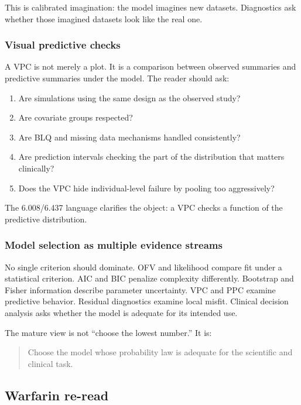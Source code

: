 This is calibrated imagination: the model imagines new datasets.  Diagnostics ask whether those imagined datasets look like the real one.

\subsubsection*{Visual predictive checks}

A VPC is not merely a plot.  It is a comparison between observed summaries and predictive summaries under the model.  The reader should ask:
\begin{enumerate}[leftmargin=2em]
  \item Are simulations using the same design as the observed study?
  \item Are covariate groups respected?
  \item Are BLQ and missing data mechanisms handled consistently?
  \item Are prediction intervals checking the part of the distribution that matters clinically?
  \item Does the VPC hide individual-level failure by pooling too aggressively?
\end{enumerate}
The 6.008/6.437 language clarifies the object: a VPC checks a function of the predictive distribution.

\subsubsection*{Model selection as multiple evidence streams}

No single criterion should dominate.  OFV and likelihood compare fit under a statistical criterion.  AIC and BIC penalize complexity differently.  Bootstrap and Fisher information describe parameter uncertainty.  VPC and PPC examine predictive behavior.  Residual diagnostics examine local misfit.  Clinical decision analysis asks whether the model is adequate for its intended use.

The mature view is not ``choose the lowest number.''  It is:
\begin{quote}
  Choose the model whose probability law is adequate for the scientific and clinical task.
\end{quote}

\subsection{Warfarin re-read}

